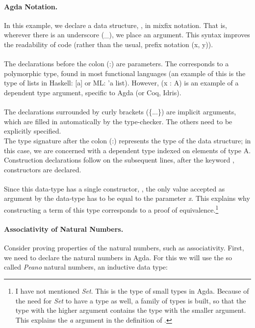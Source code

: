 \documentclass[12pt,twoside,notitlepage]{report}
\begin{document}
\paragraph{Agda Notation.}

In this example, we declare a data structure, , in mixfix notation. That is, wherever there is an underscore (\_), we place an argument. This syntax improves the readability of code (rather than the usual, prefix notation (x, y)).\\\\
The declarations before the colon (:) are parameters. The \AgdaSymbol{\{} \AgdaSymbol{:}  \AgdaSymbol{\}} corresponds to a polymorphic type, found in most functional languages (an example of this is the type of lists in Haskell: [a] or ML: 'a list). However, (x : A) is an example of a dependent type argument, specific to Agda (or Coq, Idris). \\\\
The declarations surrounded by curly brackets (\{...\}) are implicit arguments, which are filled in automatically by the type-checker. The others need to be explicitly specified.\\
The type signature after the colon (:) represents the type of the data structure; in this case, we are concerned with a dependent type indexed on elements of type A. Construction declarations follow on the subsequent lines, after the keyword , constructors are declared. \\\\
Since this data-type has a single constructor, , the only value accepted as argument by the data-type has to be equal to the parameter \textit{x}. This explains why constructing a term of this type corresponds to a proof of equivalence.\footnote{I have not mentioned \textit{Set}. This is the type of small types in Agda. Because of the need for \textit{Set} to have a type as well, a family of types is built, so that the type with the higher argument contains the type with the smaller argument. This explains the \textit{a} argument in the definition of .}

\paragraph{Associativity of Natural Numbers.}

Consider proving properties of the natural numbers, such as associativity. First, we need to declare the natural numbers in Agda. For this we will use the so called \textit{Peano} natural numbers, an inductive data type: \\
\end{document}
